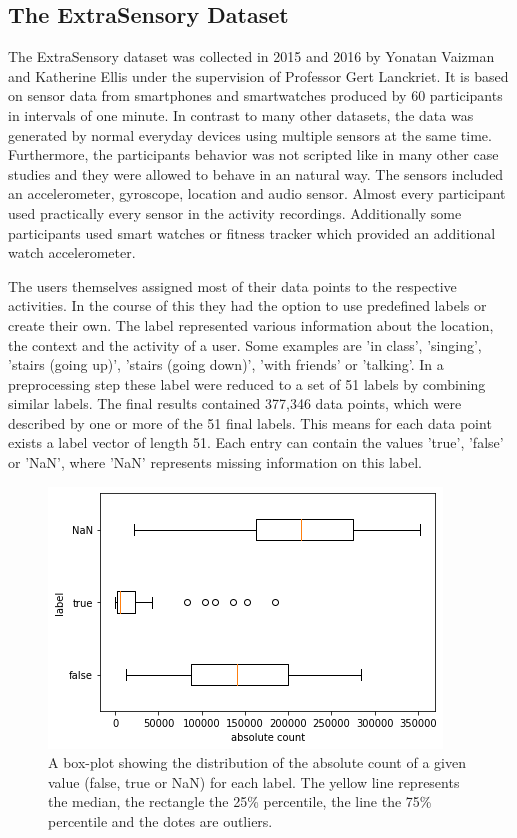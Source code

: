 \subsection{The ExtraSensory Dataset}

The ExtraSensory dataset was collected in 2015 and 2016 by Yonatan Vaizman and Katherine Ellis under the supervision of Professor Gert Lanckriet. It is based on sensor data from smartphones and smartwatches produced by 60 participants in intervals of one minute. In contrast to many other datasets, the data was generated by normal everyday devices using multiple sensors at the same time. Furthermore, the participants behavior was not scripted like in many other case studies and they were allowed to behave in an natural way. The sensors included an accelerometer, gyroscope, location and audio sensor. Almost every participant used practically every sensor in the activity recordings. Additionally some participants used smart watches or fitness tracker which provided an additional watch accelerometer.

The users themselves assigned most of their data points to the respective activities. In the course of this they had the option to use predefined labels or create their own. The label represented various information about the location, the context and the activity of a user. Some examples are 'in class', 'singing', 'stairs (going up)', 'stairs (going down)', 'with friends' or 'talking'. In a preprocessing step these label were reduced to a set of 51 labels by combining similar labels.
The final results contained 377,346 data points, which were described by one or more of the 51 final labels. This means for each data point exists a label vector of length 51. Each entry can contain the values 'true', 'false' or 'NaN', where 'NaN' represents missing information on this label.

\begin{figure}[H]
	\begin{center}
		\includegraphics[scale=.8]{images/boxplot_label.png}
		\caption{A box-plot showing the distribution of the absolute count of a given value (false, true or NaN) for each label. The yellow line represents the median, the rectangle the 25\% percentile, the line the 75\% percentile and the dotes are outliers.}
		\label{abb:boxplot_label}
	\end{center}		
\end{figure}

